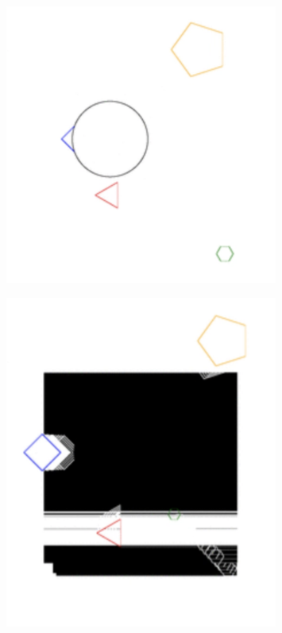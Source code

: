 \documentclass[12pt]{book}
\begin{document}
\begin{figure}
    \centering
    \includegraphics[width=0.8\textwidth]{rendering/figures/s1.png}
\end{figure}
\begin{figure}
    \centering
    \includegraphics[width=0.8\textwidth]{rendering/figures/s2.png}
\end{figure}
\end{document}
